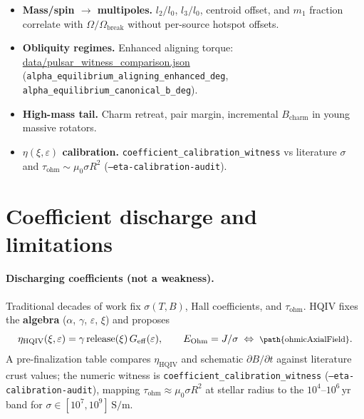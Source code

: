 \documentclass[11pt,notitlepage]{amsart}
\newcommand{\leanid}[1]{{\footnotesize\path{#1}}}
\newcommand{\datafile}[1]{{\footnotesize\url{data/#1}}}
\begin{document}
\begin{itemize}[nosep]
\item \textbf{Mass/spin $\rightarrow$ multipoles.} $l_2/l_0$, $l_3/l_0$, centroid offset,
and $m_1$ fraction correlate with $\Omega/\Omega_{\mathrm{break}}$ without per-source
hotspot offsets.
\item \textbf{Obliquity regimes.} Enhanced aligning torque:
\datafile{pulsar\_witness\_comparison.json} (\texttt{alpha\_equilibrium\_aligning\_enhanced\_deg},
\texttt{alpha\_equilibrium\_canonical\_b\_deg}).
\item \textbf{High-mass tail.} Charm retreat, pair margin, incremental $B_{\mathrm{charm}}$
in young massive rotators.
\item \textbf{$\eta(\xi,\varepsilon)$ calibration.} \texttt{coefficient\_calibration\_witness}
vs literature $\sigma$ and $\tau_{\mathrm{ohm}}\sim\mu_0\sigma R^2$
(\texttt{--eta-calibration-audit}).
\end{itemize}

\section{Coefficient discharge and limitations}
\label{sec:limitations}

\paragraph{Discharging coefficients (not a weakness).}
Traditional decades of work fix $\sigma(T,B)$, Hall coefficients, and $\tau_{\mathrm{ohm}}$.
HQIV fixes the \textbf{algebra} ($\alpha$, $\gamma$, $\varepsilon$, $\xi$) and proposes
\begin{equation}
  \eta_{\mathrm{HQIV}}(\xi,\varepsilon)=\gamma\,\mathrm{release}(\xi)\,G_{\mathrm{eff}}(\varepsilon),
  \qquad
  E_{\mathrm{Ohm}} = J/\sigma \;\Leftrightarrow\; \text{\leanid{ohmicAxialField}}.
\end{equation}
A pre-finalization table compares $\eta_{\mathrm{HQIV}}$ and schematic $\partial B/\partial t$
against literature crust values; the numeric witness is
\texttt{coefficient\_calibration\_witness} (\texttt{--eta-calibration-audit}), mapping
$\tau_{\mathrm{ohm}}\approx\mu_0\sigma R^2$ at stellar radius to the $10^4$--$10^6\,\mathrm{yr}$
band for $\sigma\in[10^7,10^9]\,\mathrm{S/m}$.
\end{document}
